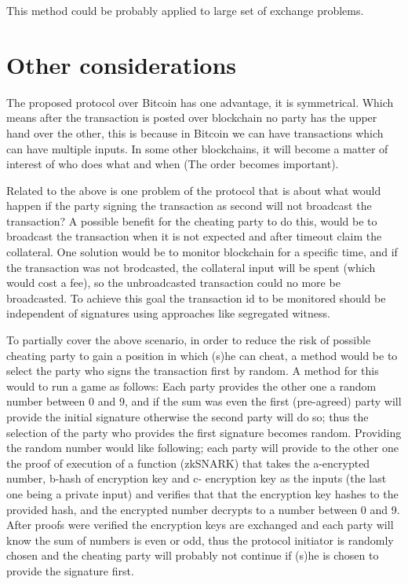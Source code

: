 \documentclass[]{article}
\begin{document}
This method could be probably applied to large set of exchange problems.

\section{Other considerations}

The proposed protocol over Bitcoin has one advantage, it is symmetrical. Which means after the transaction is posted over blockchain no party has the upper hand over the other, this is because in Bitcoin we can have transactions which can have multiple inputs. In some other blockchains, it will become a matter of interest of who does what and when (The order becomes important).

Related to the above is one problem of the protocol that is about what would happen if the party signing the transaction as second will not broadcast the transaction? A possible benefit for the cheating party to do this, would be to broadcast the transaction when it is not expected and after timeout claim the collateral. One solution would be to monitor blockchain for a specific time, and if the transaction was not brodcasted, the collateral input will be spent (which would cost a fee), so the unbroadcasted transaction could no more be broadcasted. To achieve this goal the transaction id to be monitored should be independent of signatures using approaches like segregated witness\cite{segwit}.

To partially cover the above scenario, in order to reduce the risk of possible cheating party to gain a position in which (s)he can cheat, a method would be to select the party who signs the transaction first by random. A method for this would to run a game as follows: Each party provides the other one a random number between 0 and 9, and if the sum was even the first (pre-agreed) party will provide the initial signature otherwise the second party will do so; thus the selection of the party who provides the first signature becomes random. Providing the random number would like following; each party will provide to the other one the proof of execution of a function (zkSNARK) that takes the a-encrypted number, b-hash of encryption key and c- encryption key as the inputs (the last one being a private input) and verifies that that the encryption key hashes to the provided hash, and the encrypted number decrypts to a number between 0 and 9. After proofs were verified the encryption keys are exchanged and each party will know the sum of numbers is even or odd, thus the protocol initiator is randomly chosen and the cheating party will probably not continue if (s)he is chosen to provide the signature first.
\end{document}
